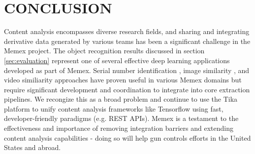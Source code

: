 \section{CONCLUSION} \label{sec:future}
Content analysis encompasses diverse research fields, and sharing and integrating derivative data generated by various teams has been a significant challenge in the Memex project. The object recognition results discussed in section \ref{sec:evaluation} represent one of several effective deep learning applications developed as part of Memex. Serial number identification \cite{parekh2016tesseract}, image similarity \cite{zhou2016multimedia}, and video similiarity \cite{mattmann2016scalable} approaches have proven useful in various Memex domains but require significant development and coordination to integrate into core extraction pipelines. We recongize this as a broad problem and continue to use the Tika platform to unify content analysis frameworks like Tensorflow using fast, developer-friendly paradigms (e.g. REST APIs). Memex is a testament to the effectiveness and importance of removing integration barriers and extending content analysis capabilities - doing so will help gun controls efforts in the United States and abroad. 
